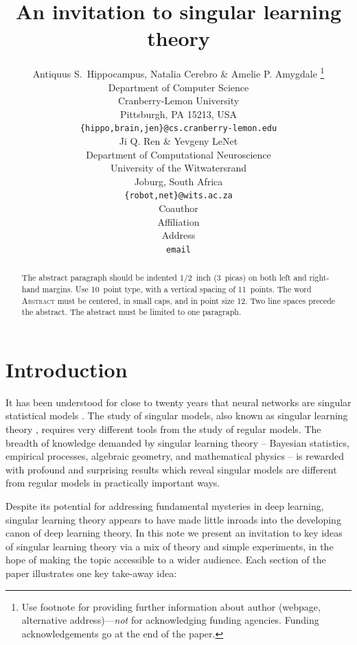 \documentclass{article} %
\title{An invitation to singular learning theory}
\author{Antiquus S.~Hippocampus, Natalia Cerebro \& Amelie P. Amygdale \thanks{ Use footnote for providing further information
about author (webpage, alternative address)---\emph{not} for acknowledging
funding agencies.  Funding acknowledgements go at the end of the paper.} \\
Department of Computer Science\\
Cranberry-Lemon University\\
Pittsburgh, PA 15213, USA \\
\texttt{\{hippo,brain,jen\}@cs.cranberry-lemon.edu} \\
\And
Ji Q. Ren \& Yevgeny LeNet \\
Department of Computational Neuroscience \\
University of the Witwatersrand \\
Joburg, South Africa \\
\texttt{\{robot,net\}@wits.ac.za} \\
\AND
Coauthor \\
Affiliation \\
Address \\
\texttt{email}
}
\begin{document}
\maketitle

\begin{abstract}
The abstract paragraph should be indented 1/2~inch (3~picas) on both left and
right-hand margins. Use 10~point type, with a vertical spacing of 11~points.
The word \textsc{Abstract} must be centered, in small caps, and in point size 12. Two
line spaces precede the abstract. The abstract must be limited to one
paragraph.
\end{abstract}

\section{Introduction}

It has been understood for close to twenty years that neural networks are singular statistical models \cite{amari_learning_2003, watanabe_almost_2007}.
The study of singular models, also known as singular learning theory \citep{watanabe_algebraic_2009}, requires very different tools from the study of regular models. The breadth of knowledge demanded by singular learning theory -- Bayesian statistics, empirical processes, algebraic geometry, and mathematical physics -- is rewarded with profound and surprising results which reveal singular models are different from regular models in practically important ways.


Despite its potential for addressing fundamental mysteries in deep learning, singular learning theory appears to have made little inroads into the developing canon of deep learning theory. In this note we present an invitation to key ideas of singular learning theory via a mix of theory and simple experiments, in the hope of making the topic accessible to a wider audience. 
Each section of the paper illustrates one key take-away idea:
\end{document}
